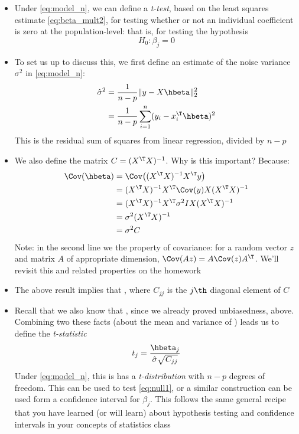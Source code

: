 \documentclass{article}
\begin{document}
\begin{itemize}
\item Under \eqref{eq:model_n}, we can define a \emph{t-test}, based on the
  least squares estimate \eqref{eq:beta_mult2}, for testing whether or not an 
  individual coefficient is zero at the population-level: that is, for testing
  the hypothesis 
  \begin{equation}
  \label{eq:null1}
  H_0 : \beta_j = 0
  \end{equation}

\item To set us up to discuss this, we first define an estimate of the noise
  variance $\sigma^2$ in \eqref{eq:model_n}:
  \begin{align*}
  \hat\sigma^2 &= \frac{1}{n-p} \|y - X\hbeta\|_2^2 \\ 
  &= \frac{1}{n-p} \sum_{i=1}^n (y_ i - x_i^\T \hbeta)^2 
  \end{align*}
  This is the residual sum of squares from linear regression, divided by $n-p$ 

\item We also define the matrix $C = (X^\T X)^{-1}$. Why is this important?
  Because: 
  \begin{align*}
  \Cov(\hbeta) &= \Cov\big( (X^\T X)^{-1} X^\T y \big) \\
  &= (X^\T X)^{-1} X^\T \Cov(y) X (X^\T X)^{-1} \\
  &=  (X^\T X)^{-1} X^\T \sigma^2 I X (X^\T X)^{-1} \\
  &= \sigma^2 (X^\T X)^{-1} \\
  &= \sigma^2 C
  \end{align*}
  Note: in the second line we the property of covariance: for a random vector
  $z$ and matrix $A$ of appropriate dimension, $\Cov(Az) = A \Cov(z)
  A^\T$. We'll revisit this and related properties on the homework

\item The above result implies that ,
  where $C_{jj}$ is the $j\th$ diagonal element of $C$

\item Recall that we also know that , since we
  already proved unbiasedness, above. Combining two these facts (about the mean 
  and variance of ) leads us to define the \emph{t-statistic}  
  \begin{equation}
  \label{eq:t_stat}
  t_j = \frac{\hbeta_j}{\hat\sigma \sqrt{C_{jj}}} 
  \end{equation}
  Under \eqref{eq:model_n}, this is has a \emph{t-distribution} with $n-p$
  degrees of freedom. This can be used to test \eqref{eq:null1}, or a similar
  construction can be used form a confidence interval for $\beta_j$. This
  follows the same general recipe that you have learned (or will learn) about
  hypothesis testing and confidence intervals in your concepts of statistics
  class 


\end{itemize}
\end{document}
